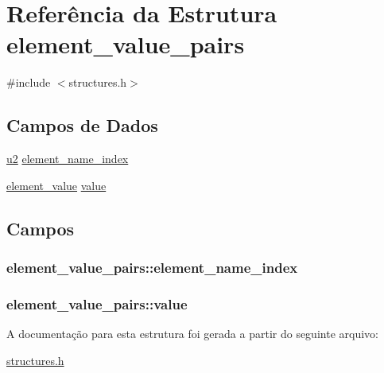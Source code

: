 \hypertarget{structelement__value__pairs}{}\section{Referência da Estrutura element\+\_\+value\+\_\+pairs}
\label{structelement__value__pairs}


{\ttfamily \#include $<$structures.\+h$>$}

\subsection*{Campos de Dados}
\begin{DoxyCompactItemize}
\item 
\hyperlink{lista__operandos_8h_a732cde1300aafb73b0ea6c2558a7a54f}{u2} \hyperlink{structelement__value__pairs_afbd19773ad9b0623269f7fbd649b6220}{element\+\_\+name\+\_\+index}
\item 
\hyperlink{structelement__value}{element\+\_\+value} \hyperlink{structelement__value__pairs_ab1c879e0865cca531bd7565a71995668}{value}
\end{DoxyCompactItemize}


\subsection{Campos}
\subsubsection[{\texorpdfstring{element\+\_\+name\+\_\+index}{element_name_index}}]{ element\+\_\+value\+\_\+pairs\+::element\+\_\+name\+\_\+index}\hypertarget{structelement__value__pairs_afbd19773ad9b0623269f7fbd649b6220}{}\label{structelement__value__pairs_afbd19773ad9b0623269f7fbd649b6220}
\subsubsection[{\texorpdfstring{value}{value}}]{ element\+\_\+value\+\_\+pairs\+::value}\hypertarget{structelement__value__pairs_ab1c879e0865cca531bd7565a71995668}{}\label{structelement__value__pairs_ab1c879e0865cca531bd7565a71995668}


A documentação para esta estrutura foi gerada a partir do seguinte arquivo\+:\begin{DoxyCompactItemize}
\item 
\hyperlink{structures_8h}{structures.\+h}\end{DoxyCompactItemize}
